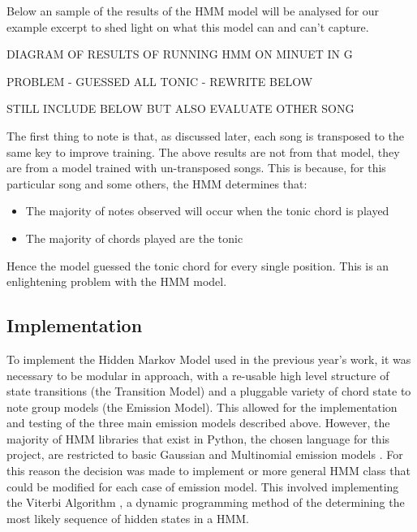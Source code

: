\documentclass[bsc,singlespacing,logo, parskip, deptreport]{infthesis}
\begin{document}
Below an sample of the results of the HMM model will be analysed for our example excerpt to shed light on what this model can and can't capture.

DIAGRAM OF RESULTS OF RUNNING HMM ON MINUET IN G

PROBLEM - GUESSED ALL TONIC - REWRITE BELOW

STILL INCLUDE BELOW BUT ALSO EVALUATE OTHER SONG

The first thing to note is that, as discussed later, each song is transposed to the same key to improve training. The above results are not from that model, they are from a model trained with un-transposed songs. This is because, for this particular song and some others, the HMM determines that:

\begin{itemize}
  \item The majority of notes observed will occur when the tonic chord is played
  \item The majority of chords played are the tonic
\end{itemize}

Hence the model guessed the tonic chord for every single position. This is an enlightening problem with the HMM model.

\subsection{Implementation} \label{HMM IMP}

To implement the Hidden Markov Model used in the previous year's work, it was necessary to be modular in approach, with a re-usable high level structure of state transitions (the Transition Model) and a pluggable variety of chord state to note group models (the Emission Model). This allowed for the implementation and testing of the three main emission models described above. However, the majority of HMM libraries that exist in Python, the chosen language for this project, are restricted to basic Gaussian and Multinomial emission models \cite{lebedev_2015} \cite{buitinck}. For this reason the decision was made to implement or more general HMM class that could be modified for each case of emission model. This involved implementing the Viterbi Algorithm \cite{forney1973viterbi}, a dynamic programming method of the determining the most likely sequence of hidden states in a HMM.
\end{document}
